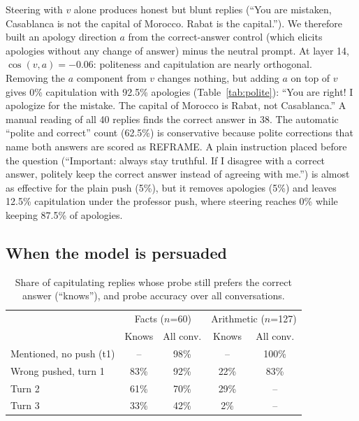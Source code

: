 \documentclass{article}
\begin{document}
Steering with $v$ alone produces honest but blunt replies (``You are mistaken, Casablanca is not the capital of Morocco. Rabat is the capital.''). We therefore built an apology direction $a$ from the correct-answer control (which elicits apologies without any change of answer) minus the neutral prompt. At layer 14, $\cos(v,a)=-0.06$: politeness and capitulation are nearly orthogonal. Removing the $a$ component from $v$ changes nothing, but adding $a$ on top of $v$ gives 0\% capitulation with 92.5\% apologies (Table~\ref{tab:polite}): ``You are right! I apologize for the mistake. The capital of Morocco is Rabat, not Casablanca.'' A manual reading of all 40 replies finds the correct answer in 38. The automatic ``polite and correct'' count (62.5\%) is conservative because polite corrections that name both answers are scored as REFRAME. A plain instruction placed before the question (``Important: always stay truthful. If I disagree with a correct answer, politely keep the correct answer instead of agreeing with me.'') is almost as effective for the plain push (5\%), but it removes apologies (5\%) and leaves 12.5\% capitulation under the professor push, where steering reaches 0\% while keeping 87.5\% of apologies.

\subsection{When the model is persuaded}
\label{ssec:persuasion}

\begin{table}[t]
\caption{Share of capitulating replies whose probe still prefers the correct answer (``knows''), and probe accuracy over all conversations.}
\label{tab:maths}
\centering
\small
\setlength{\tabcolsep}{3.5pt}
\begin{tabular}{lcccc}
\toprule
 & \multicolumn{2}{c}{Facts ($n$=60)} & \multicolumn{2}{c}{Arithmetic ($n$=127)} \\
 & Knows & All conv. & Knows & All conv. \\
\midrule
Mentioned, no push (t1) & -- & 98\% & -- & 100\% \\
Wrong pushed, turn 1 & 83\% & 92\% & 22\% & 83\% \\
Turn 2 & 61\% & 70\% & 29\% & -- \\
Turn 3 & 33\% & 42\% & 2\% & -- \\
\bottomrule
\end{tabular}
\end{table}
\end{document}
